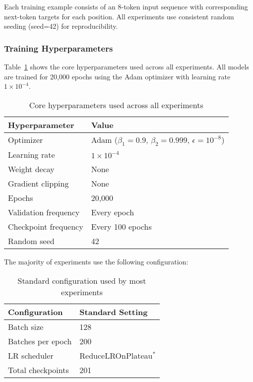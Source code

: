 Each training example consists of an 8-token input sequence with corresponding next-token targets for each position. All experiments use consistent random seeding (seed=42) for reproducibility.

\subsubsection{Training Hyperparameters}

Table~\ref{tab:hyperparams} shows the core hyperparameters used across all experiments. All models are trained for 20,000 epochs using the Adam optimizer with learning rate $1 \times 10^{-4}$.

\begin{table}[h]
\centering
\caption{Core hyperparameters used across all experiments}
\label{tab:hyperparams}
\begin{tabular}{ll}
\toprule
\textbf{Hyperparameter} & \textbf{Value} \\
\midrule
Optimizer & Adam ($\beta_1=0.9$, $\beta_2=0.999$, $\epsilon=10^{-8}$) \\
Learning rate & $1 \times 10^{-4}$ \\
Weight decay & None \\
Gradient clipping & None \\
Epochs & 20,000 \\
Validation frequency & Every epoch \\
Checkpoint frequency & Every 100 epochs \\
Random seed & 42 \\
\bottomrule
\end{tabular}
\end{table}

The majority of experiments use the following configuration:

\begin{table}[h]
\centering
\caption{Standard configuration used by most experiments}
\label{tab:standard_config}
\begin{tabular}{ll}
\toprule
\textbf{Configuration} & \textbf{Standard Setting} \\
\midrule
Batch size & 128 \\
Batches per epoch & 200 \\
LR scheduler & ReduceLROnPlateau$^*$ \\
Total checkpoints & 201 \\
\bottomrule
\end{tabular}
\end{table}

